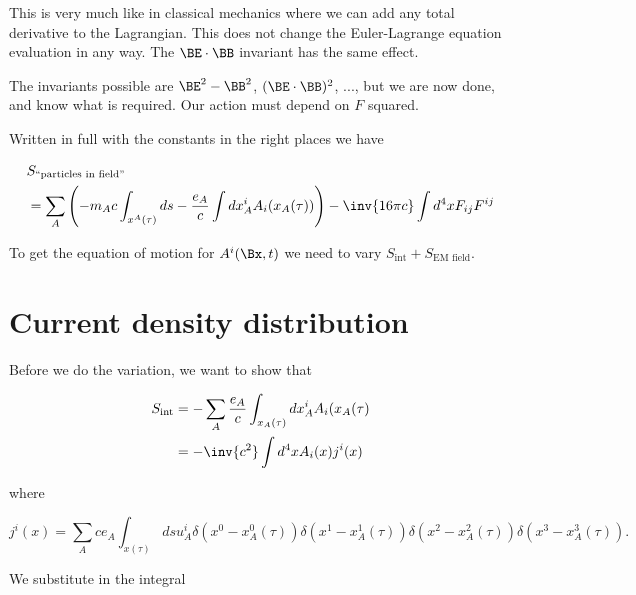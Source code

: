 This is very much like in classical mechanics where we can add any total derivative to the Lagrangian.  This does not change the Euler-Lagrange equation evaluation in any way.  The $\BE \cdot \BB$ invariant has the same effect.

The invariants possible are $\BE^2 - \BB^2$, $(\BE \cdot \BB)^2$, ..., but we are now done, and know what is required.  Our action must depend on $F$ squared.

Written in full with the constants in the right places we have

\begin{equation}\label{eqn:relativisticElectrodynamicsL12:370}
\begin{aligned}
&S_{\text{``particles in field''}} \\
&= \sum_A \left( -m_A c \int_{x^A(\tau)} ds - \frac{e_A}{c} \int dx^i_A A_i(x_A(\tau))
\right)
- \inv{16 \pi c} \int d^4 x F_{ij} F^{ij}
\end{aligned}
\end{equation}

To get the equation of motion for $A^i(\Bx, t)$ we need to vary $S_{\text{int}} + S_{\text{EM field}}$.

\section{Current density distribution}

Before we do the variation, we want to show that

\begin{equation}\label{eqn:relativisticElectrodynamicsL12b:590}
\begin{aligned}
S_{\text{int}} 
&= -\sum_A \frac{e_A}{c} \int_{x_A(\tau)} dx^i_A A_i(x_A(\tau) \\
&= -\inv{c^2} \int d^4 x A_i(x) j^i(x) 
\end{aligned}
\end{equation}

where

\begin{equation}\label{eqn:relativisticElectrodynamicsL12:390}
j^i(x) = 
\sum_A c e_A \int_{x(\tau)}
ds u^i_A 
\delta(x^0 - x^0_A(\tau))
\delta(x^1 - x^1_A(\tau))
\delta(x^2 - x^2_A(\tau))
\delta(x^3 - x^3_A(\tau)).
\end{equation}

We substitute in the integral

